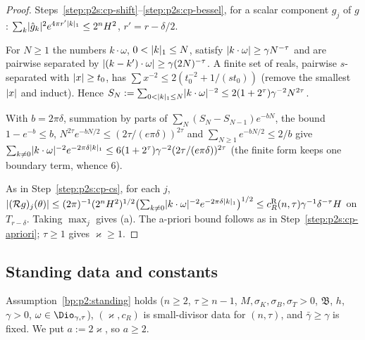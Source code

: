 \begin{proof}
\label{step:p2s:cr-bessel}
Steps~\ref{step:p2s:cp-shift}--\ref{step:p2s:cp-bessel}, for a scalar component $g_j$ of $g$: $\sum_k\lvert \hat g_k\rvert^2e^{4\pi r'\lvert k\rvert_1}\le2^nH^2$, $r'=r-\delta/2$.

\label{step:p2s:cr-shell}
For $N\ge1$ the numbers $k\cdot\omega$, $0<\lvert k\rvert_1\le N$, satisfy $\lvert k\cdot\omega\rvert\ge\gamma N^{-\tau}$ and are pairwise separated by
$\lvert (k-k')\cdot\omega\rvert\ge\gamma(2N)^{-\tau}$. A finite set of reals, pairwise $s$-separated with $\lvert x\rvert\ge t_0$, has
$\sum x^{-2}\le2(t_0^{-2}+1/(st_0))$ (remove the smallest $\lvert x\rvert$ and induct). Hence $S_N:=\sum_{0<\lvert k\rvert_1\le N}\lvert k\cdot\omega\rvert^{-2}\le
2(1+2^\tau)\gamma^{-2}N^{2\tau}$.

\label{step:p2s:cr-abel}
With $b=2\pi\delta$, summation by parts of $\sum_N(S_N-S_{N-1})e^{-bN}$, the bound $1-e^{-b}\le b$, $N^{2\tau}e^{-bN/2}\le
(2\tau/(e\pi\delta))^{2\tau}$ and $\sum_{N\ge1}e^{-bN/2}\le2/b$ give
$\sum_{k\ne0}\lvert k\cdot\omega\rvert^{-2}e^{-2\pi\delta\lvert k\rvert_1}\le6(1+2^\tau)\gamma^{-2}(2\tau/(e\pi\delta))^{2\tau}$ (the finite form keeps one boundary
term, whence $6$).

\label{step:p2s:cr-cs}
As in Step~\ref{step:p2s:cp-cs}, for each $j$, $\lvert (\mathcal Rg)_j(\theta)\rvert\le(2\pi)^{-1}(2^nH^2)^{1/2}\bigl(\sum_{k\ne0}\lvert k\cdot\omega\rvert^{-2}e^{-2\pi\delta\lvert k\rvert_1}\bigr)^{1/2}
\le c_R^{\mathrm R}(n,\tau)\gamma^{-1}\delta^{-\tau}H$ on $T_{r-\delta}$. Taking $\max_j$ gives (a). The a-priori bound follows as in Step~\ref{step:p2s:cp-apriori}; $\tau\ge1$ gives
$\varkappa\ge1$.
\end{proof}

\subsection{Standing data and constants}\label{bp:p2s:sec-setting}

\begin{assumption}\label{bp:p2s:standing}
Assumption~\ref{bp:p2:standing} holds ($n\ge2$, $\tau\ge n-1$, $M,\sigma_K,\sigma_B,\sigma_T>0$, $\mathfrak B$, $h$,
$\gamma>0$, $\omega\in\Dio_{\gamma,\tau}$), $(\varkappa,c_R)$ is small-divisor data for $(n,\tau)$, and
$\bar\gamma\ge\gamma$ is fixed. We put $a:=2\varkappa$, so $a\ge2$.
\end{assumption}

